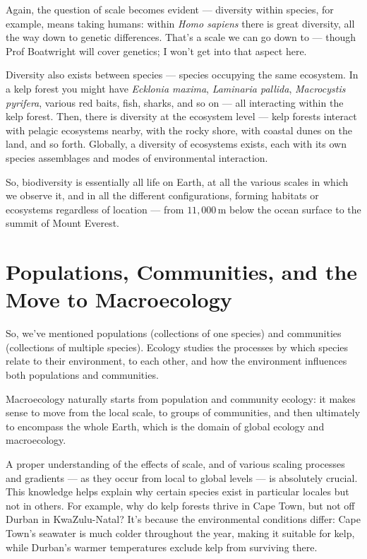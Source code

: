 \documentclass[
  10pt,
]{book}
\begin{document}
Again, the question of scale becomes evident --- diversity within
species, for example, means taking humans: within \emph{Homo sapiens}
there is great diversity, all the way down to genetic differences.
That's a scale we can go down to --- though Prof Boatwright will cover
genetics; I won't get into that aspect here.

Diversity also exists between species --- species occupying the same
ecosystem. In a kelp forest you might have \emph{Ecklonia maxima},
\emph{Laminaria pallida}, \emph{Macrocystis pyrifera}, various red
baits, fish, sharks, and so on --- all interacting within the kelp
forest. Then, there is diversity at the ecosystem level --- kelp forests
interact with pelagic ecosystems nearby, with the rocky shore, with
coastal dunes on the land, and so forth. Globally, a diversity of
ecosystems exists, each with its own species assemblages and modes of
environmental interaction.

So, biodiversity is essentially all life on Earth, at all the various
scales in which we observe it, and in all the different configurations,
forming habitats or ecosystems regardless of location --- from
\(11,000\,\mathrm{m}\) below the ocean surface to the summit of Mount
Everest.

\section{Populations, Communities, and the Move to
Macroecology}\label{populations-communities-and-the-move-to-macroecology}

So, we've mentioned populations (collections of one species) and
communities (collections of multiple species). Ecology studies the
processes by which species relate to their environment, to each other,
and how the environment influences both populations and communities.

Macroecology naturally starts from population and community ecology: it
makes sense to move from the local scale, to groups of communities, and
then ultimately to encompass the whole Earth, which is the domain of
global ecology and macroecology.

A proper understanding of the effects of scale, and of various scaling
processes and gradients --- as they occur from local to global levels
--- is absolutely crucial. This knowledge helps explain why certain
species exist in particular locales but not in others. For example, why
do kelp forests thrive in Cape Town, but not off Durban in
KwaZulu-Natal? It's because the environmental conditions differ: Cape
Town's seawater is much colder throughout the year, making it suitable
for kelp, while Durban's warmer temperatures exclude kelp from surviving
there.
\end{document}
